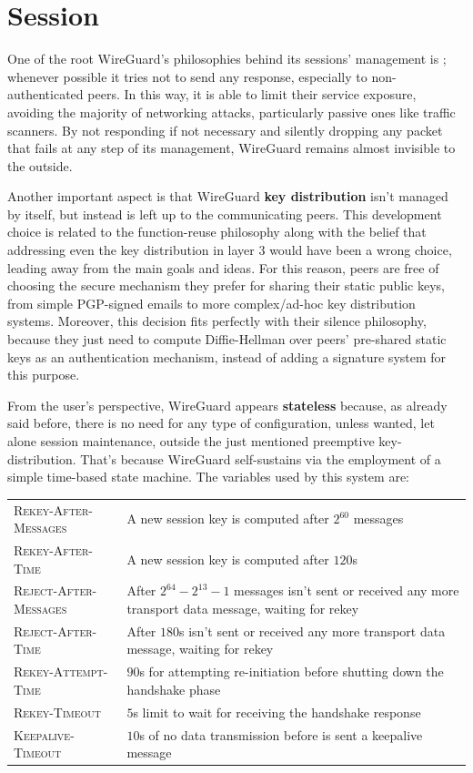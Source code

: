 \documentclass[light]{academica}
\begin{document}
\section{Session}\label{sec:session}

One of the root WireGuard's philosophies behind its sessions' management is ; \ie whenever possible it tries not to send any response, especially to non-au\-then\-ti\-ca\-ted peers.
In this way, it is able to limit their service exposure, avoiding the majority of networking attacks, particularly passive ones like traffic scanners.
By not responding if not necessary and silently dropping any packet that fails at any step of its management, WireGuard remains almost invisible to the outside.

Another important aspect is that WireGuard \textbf{key distribution} isn't managed by itself, but instead is left up to the communicating peers.
This development choice is related to the function-reuse philosophy along with the belief that addressing even the key distribution in layer 3 would have been a wrong choice, leading away from the main goals and ideas.
For this reason, peers are free of choosing the secure mechanism they prefer for sharing their static public keys, from simple PGP-signed emails to more complex/ad-hoc key distribution systems.
Moreover, this decision fits perfectly with their silence philosophy, because they just need to compute Diffie-Hellman over peers' pre-shared static keys as an authentication mechanism, instead of adding a signature system for this purpose.

From the user's perspective, WireGuard appears \textbf{stateless} because, as already said before, there is no need for any type of configuration, unless wanted, let alone session maintenance, outside the just mentioned preemptive key-distribution.
That's because WireGuard self-sustains via the employment of a simple time-based state machine.
The variables used by this system are:

\begin{table}[H]
  \centering
  \begin{tabularx}{0.9\textwidth}{lX}
    \textsc{Rekey-After-Messages} & A new session key is computed after $2^{60}$ messages\\
    \textsc{Rekey-After-Time} & A new session key is computed after $120$s\\
    \textsc{Reject-After-Messages} & After $2^{64} - 2^{13} - 1$ messages isn't sent or received any more transport data message, waiting for rekey\\
    \textsc{Reject-After-Time} & After $180$s isn't sent or received any more transport data message, waiting for rekey\\
    \textsc{Rekey-Attempt-Time} & $90$s for attempting re-initiation before shutting down the handshake phase\\
    \textsc{Rekey-Timeout} & $5$s limit to wait for receiving the handshake response\\
    \textsc{Keepalive-Timeout} & $10$s of no data transmission before is sent a keepalive message
  \end{tabularx}
\end{table}
\end{document}
